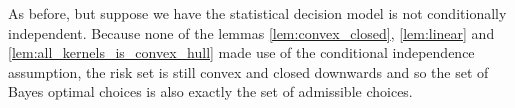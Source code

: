 \begin{example}\label{ex:cc_nonsdt}
As before, but suppose we have the statistical decision model is not conditionally independent. Because none of the lemmas \ref{lem:convex_closed}, \ref{lem:linear} and \ref{lem:all_kernels_is_convex_hull} made use of the conditional independence assumption, the risk set is still convex and closed downwards and so the set of Bayes optimal choices is also exactly the set of admissible choices.
\end{example}





